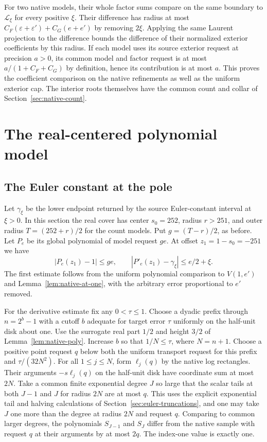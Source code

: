 \documentclass[11pt]{amsart}
\theoremstyle{definition}
\theoremstyle{remark}
\numberwithin{equation}{section}
\begin{document}
For two native models, their whole factor sums compare
on the same boundary to $\mathcal L_\xi$ for every
positive $\xi$. Their difference has radius at most
$C_F(\varepsilon+\varepsilon')+C_G(e+e')$ by
removing $2\xi$. Applying the same Laurent projection
to the difference bounds the difference of their
normalized exterior coefficients by this radius.
If each model uses its source exterior request at
precision $a>0$, its common model and factor request
is at most $a/(1+C_F+C_G)$ by definition, hence its
contribution is at most $a$. This proves the coefficient
comparison on the native refinements as well as the
uniform exterior cap. The interior roots themselves
have the common count and collar of
Section~\ref{sec:native-count}.

\section{The real-centered polynomial model}
\label{sec:real-polynomial}

\subsection{The Euler constant at the pole}

Let $\gamma_\xi$ be the lower endpoint returned by the
source Euler-constant interval at $\xi>0$.
In this section the real cover has center $s_0=252$,
radius $r>251$, and outer radius $T=(252+r)/2$ for
the count models. Put $g=(T-r)/2$, as before.
Let $P_e$ be its global polynomial of model request $ge$.
At offset $z_1=1-s_0=-251$ we have
\begin{equation}\label{eq:gamma-native-derivative}
     |P_e(z_1)-1|\le ge,\qquad
     |P'_e(z_1)-\gamma_\xi|\le e/2+\xi .
\end{equation}
The first estimate follows from the uniform polynomial
comparison to $V(1,e')$ and Lemma~\ref{lem:native-at-one},
with the arbitrary error proportional to $e'$ removed.

For the derivative estimate fix any $0<\tau\le1$.
Choose a dyadic prefix through $n=2^b-1$ with a cutoff
$b$ adequate for target error $\tau$ uniformly on the
half-unit disk about one. Use the surrogate real part
$1/2$ and height $3/2$ of
Lemma~\ref{lem:native-poly}. Increase $b$ so that
$1/N\le\tau$, where $N=n+1$. Choose a positive point
request $q$ below both the uniform transport request
for this prefix and $\tau/(32N^2)$.
For all $1\le j\le N$, form $\ell_j(q)$ by the native
log rectangles. Their arguments $-s\ell_j(q)$ on the
half-unit disk have coordinate sum at most $2N$.
Take a common finite exponential degree $J$ so large
that the scalar tails at both $J-1$ and $J$ for radius
$2N$ are at most $q$. This uses the explicit exponential
tail and halving calculations of
Section~\ref{sec:euler-truncations}, and one may take
$J$ one more than the degree at radius $2N$ and request
$q$. Comparing to common larger degrees, the
polynomials $S_{J-1}$ and $S_J$ differ from the native
sample with request $q$ at their arguments by at most
$2q$. The index-one value is exactly one.
\end{document}
